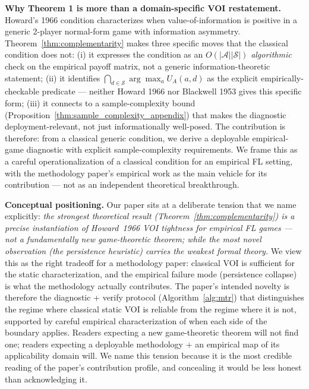\documentclass{article}
\newcommand{\UA}{U_A}
\begin{document}
\textbf{Why Theorem 1 is more than a domain-specific VOI restatement.} Howard's 1966 condition characterizes when value-of-information is positive in a generic 2-player normal-form game with information asymmetry. Theorem~\ref{thm:complementarity} makes three specific moves that the classical condition does not: (i) it expresses the condition as an $O(|\mathcal{A}||\mathcal{S}|)$ \emph{algorithmic} check on the empirical payoff matrix, not a generic information-theoretic statement; (ii) it identifies $\bigcap_{d \in \mathcal{S}} \arg\max_a \UA(a, d)$ as the explicit empirically-checkable predicate --- neither Howard 1966 nor Blackwell 1953 gives this specific form; (iii) it connects to a sample-complexity bound (Proposition~\ref{thm:sample_complexity_appendix}) that makes the diagnostic deployment-relevant, not just informationally well-posed. The contribution is therefore: from a classical generic condition, we derive a deployable empirical-game diagnostic with explicit sample-complexity requirements. We frame this as a careful operationalization of a classical condition for an empirical FL setting, with the methodology paper's empirical work as the main vehicle for its contribution --- not as an independent theoretical breakthrough.

\textbf{Conceptual positioning.} Our paper sits at a deliberate tension that we name explicitly: \emph{the strongest theoretical result (Theorem~\ref{thm:complementarity}) is a precise instantiation of Howard~1966 VOI tightness for empirical FL games --- not a fundamentally new game-theoretic theorem; while the most novel observation (the persistence heuristic) carries the weakest formal theory.} We view this as the right tradeoff for a methodology paper: classical VOI is sufficient for the static characterization, and the empirical failure mode (persistence collapse) is what the methodology actually contributes. The paper's intended novelty is therefore the diagnostic + verify protocol (Algorithm~\ref{alg:mtr}) that distinguishes the regime where classical static VOI is reliable from the regime where it is not, supported by careful empirical characterization of when each side of the boundary applies. Readers expecting a new game-theoretic theorem will not find one; readers expecting a deployable methodology + an empirical map of its applicability domain will. We name this tension because it is the most credible reading of the paper's contribution profile, and concealing it would be less honest than acknowledging it.
\end{document}
